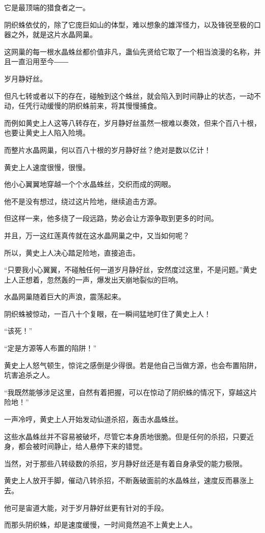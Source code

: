 \begin{this_body}
它是最顶端的猎食者之一。

阴织蛛依仗的，除了它庞巨如山的体型，难以想象的雄浑怪力，以及锋锐至极的口器之外，就是这片水晶网巢。

这网巢的每一根水晶蛛丝都价值非凡，蛊仙先贤给它取了一个相当浪漫的名称，并且一直沿用至今――

岁月静好丝。

但凡七转或者以下的存在，碰触到这个蛛丝，就会陷入到时间静止的状态，一动不动，任凭行动缓慢的阴织蛛前来，将其慢慢捕食。

而例如黄史上人这等八转存在，岁月静好丝虽然一根难以奏效，但来个百八十根，也要让黄史上人陷入险境。

而整片水晶网巢，何以百八十根的岁月静好丝？绝对是数以亿计！

黄史上人速度很慢，很慢。

他小心翼翼地穿越一个个水晶蛛丝，交织而成的网眼。

他不是没有想过，绕过这片险地，继续追击方源。

但这样一来，他多绕了一段远路，势必会让方源争取到更多的时间。

并且，万一这红莲真传就在这水晶网巢之中，又当如何呢？

所以，黄史上人决心踏足险地，直接追击。

“只要我小心翼翼，不碰触任何一道岁月静好丝，安然度过这里，不是问题。”黄史上人正想着，忽然轰的一声，爆发出天崩地裂似的巨响。

水晶网巢随着巨大的声浪，震荡起来。

阴织蛛被惊动，一百八十个复眼，在一瞬间猛地盯住了黄史上人！

“该死！”

“定是方源等人布置的陷阱！”

黄史上人怒气顿生，惊诧之感倒是少得很。若是他自己当做方源，也会布置陷阱，坑害追杀之人。

“我既然能够涉足这里，自然有着把握，可以在惊动了阴织蛛的情况下，穿越这片险地！”

一声冷哼，黄史上人开始发动仙道杀招，轰击水晶蛛丝。

这些水晶蛛丝并不容易被破坏，尽管它本身质地很脆。但是任何的杀招，只要近身，都会被时间静止，给人悬停下来的错觉。

当然，对于那些八转级数的杀招，岁月静好丝还是有着自身承受的能力极限。

黄史上人放开手脚，催动八转杀招，不断轰破面前的水晶蛛丝，速度反而暴涨上去。

他可是宙道大能，对于岁月静好丝更有针对的手段。

而那头阴织蛛，却是速度缓慢，一时间竟然追不上黄史上人。


\end{this_body}
